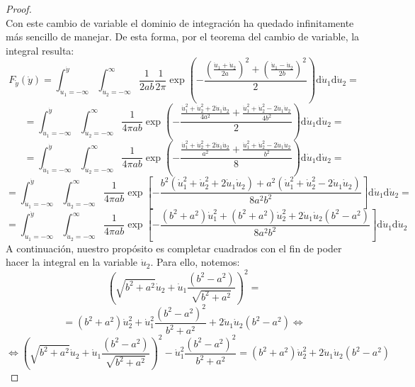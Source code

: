 \documentclass[11pt,a4paper,spanish]{article}
\numberwithin{equation}{section}
\numberwithin{table}{section}
\numberwithin{figure}{section}
\theoremstyle{definition}
\theoremstyle{remark}
\theoremstyle{definition}
\theoremstyle{remark}
\theoremstyle{plain}
\theoremstyle{plain}
\theoremstyle{plain}
\theoremstyle{plain}
\theoremstyle{plain}
\theoremstyle{plain}
\begin{document}
\begin{proof}
\[		\]
		Con este cambio de variable el dominio de integración ha quedado infinitamente
		más sencillo de manejar. De esta forma, por el teorema del cambio
		de variable, la integral resulta:
		\[
		F_{\mathring{y}}\left(\dot{y}\right)=\int_{\dot{u}_{1}=-\infty}^{\dot{y}}\int_{\dot{u}_{2}=-\infty}^{\infty}\frac{1}{2ab}\frac{1}{2\pi}\exp\left(-\frac{\left(\frac{\dot{u}_{1}+\dot{u}_{2}}{2a}\right)^{2}+\left(\frac{\dot{u}_{1}-\dot{u}_{2}}{2b}\right)^{2}}{2}\right)\mathrm{d}\dot{u}_{1}\mathrm{d}\dot{u}_{2}=
		\]
		\[
		=\int_{\dot{u}_{1}=-\infty}^{\dot{y}}\int_{\dot{u}_{2}=-\infty}^{\infty}\frac{1}{4\pi ab}\exp\left(-\frac{\frac{\dot{u}_{1}^{2}+\dot{u}_{2}^{2}+2\dot{u}_{1}\dot{u}_{2}}{4a^{2}}+\frac{\dot{u}_{1}^{2}+\dot{u}_{2}^{2}-2\dot{u}_{1}\dot{u}_{2}}{4b^{2}}}{2}\right)\mathrm{d}\dot{u}_{1}\mathrm{d}\dot{u}_{2}=
		\]
		\[
		=\int_{\dot{u}_{1}=-\infty}^{\dot{y}}\int_{\dot{u}_{2}=-\infty}^{\infty}\frac{1}{4\pi ab}\exp\left(-\frac{\frac{\dot{u}_{1}^{2}+\dot{u}_{2}^{2}+2\dot{u}_{1}\dot{u}_{2}}{a^{2}}+\frac{\dot{u}_{1}^{2}+\dot{u}_{2}^{2}-2\dot{u}_{1}\dot{u}_{2}}{b^{2}}}{8}\right)\mathrm{d}\dot{u}_{1}\mathrm{d}\dot{u}_{2}=
		\]
		\[
		=\int_{\dot{u}_{1}=-\infty}^{\dot{y}}\int_{\dot{u}_{2}=-\infty}^{\infty}\frac{1}{4\pi ab}\exp\left[-\frac{b^{2}\left(\dot{u}_{1}^{2}+\dot{u}_{2}^{2}+2\dot{u}_{1}\dot{u}_{2}\right)+a^{2}\left(\dot{u}_{1}^{2}+\dot{u}_{2}^{2}-2\dot{u}_{1}\dot{u}_{2}\right)}{8a^{2}b^{2}}\right]\mathrm{d}\dot{u}_{1}\mathrm{d}\dot{u}_{2}=
		\]
		\begin{equation}
			=\int_{\dot{u}_{1}=-\infty}^{\dot{y}}\int_{\dot{u}_{2}=-\infty}^{\infty}\frac{1}{4\pi ab}\exp\left[-\frac{\left(b^{2}+a^{2}\right)\dot{u}_{1}^{2}+\left(b^{2}+a^{2}\right)\dot{u}_{2}^{2}+2\dot{u}_{1}\dot{u}_{2}\left(b^{2}-a^{2}\right)}{8a^{2}b^{2}}\right]\mathrm{d}\dot{u}_{1}\mathrm{d}\dot{u}_{2}\label{eq:Suma Gauss int}
		\end{equation}
		A continuación, nuestro propósito es completar cuadrados con el fin
		de poder hacer la integral en la variable $\dot{u}_{2}$. Para ello,
		notemos:
		\[
		\left(\sqrt{b^{2}+a^{2}}\dot{u}_{2}+\dot{u}_{1}\frac{\left(b^{2}-a^{2}\right)}{\sqrt{b^{2}+a^{2}}}\right)^{2}=
		\]
		\[
		=\left(b^{2}+a^{2}\right)\dot{u}_{2}^{2}+\dot{u}_{1}^{2}\frac{\left(b^{2}-a^{2}\right)^{2}}{b^{2}+a^{2}}+2\dot{u}_{1}\dot{u}_{2}\left(b^{2}-a^{2}\right)\iff
		\]
		\[
		\iff\left(\sqrt{b^{2}+a^{2}}\dot{u}_{2}+\dot{u}_{1}\frac{\left(b^{2}-a^{2}\right)}{\sqrt{b^{2}+a^{2}}}\right)^{2}-\dot{u}_{1}^{2}\frac{\left(b^{2}-a^{2}\right)^{2}}{b^{2}+a^{2}}=\left(b^{2}+a^{2}\right)\dot{u}_{2}^{2}+2\dot{u}_{1}\dot{u}_{2}\left(b^{2}-a^{2}\right)
\]
\end{proof}
\end{document}
